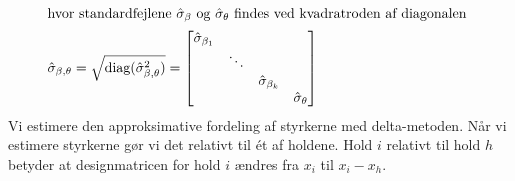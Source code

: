 \documentclass[11pt,a4paper]{article}
\begin{document}
\begin{align}
\intertext{hvor standardfejlene $\hat{\sigma}_\beta$ og $\hat{\sigma}_\theta$ findes ved kvadratroden af diagonalen }
\hat{\sigma}_{\beta,\theta}=\sqrt{\text{diag}(\hat{\sigma}^2_{\beta,\theta})}=
\begin{bmatrix}
\hat{\sigma}_{\beta_1}& &\\
& \ddots & \\
& & \hat{\sigma}_{\beta_k} \\
& & & \hat{\sigma}_{\theta}
\end{bmatrix}
\end{align}
Vi estimere den approksimative fordeling af styrkerne med delta-metoden. Når vi estimere styrkerne gør vi det relativt til ét af holdene. Hold $i$ relativt til hold $h$ betyder at designmatricen for hold $i$ ændres fra $x_i$ til $x_i-x_h$.
\end{document}
